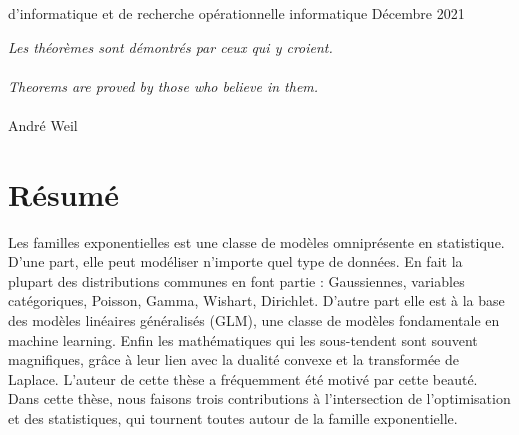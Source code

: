 \documentclass[12pt]{report} %
\numberwithin{equation}{chapter}
\numberwithin{table}{chapter}
\numberwithin{figure}{chapter}
\begin{document}




    {}
    {d'informatique et de recherche op\'{e}rationnelle}
    {informatique}
    {Décembre}
    {2021}

\PagesCouverture
\newpage
 \begin{flushright} 
 \emph{Les théorèmes sont démontrés par ceux qui y croient.}\\~\\
 \emph{Theorems are proved by those who believe in them.}  \\~\\
André Weil 
 \end{flushright}
 
 

\chapter*{Résumé}
Les familles exponentielles est une classe de modèles omniprésente en statistique.
D'une part, elle  peut modéliser n'importe quel type de données. 
En fait la plupart des distributions communes en font partie : Gaussiennes, variables catégoriques, Poisson, Gamma, Wishart, Dirichlet. 
D'autre part elle est à la base des modèles linéaires généralisés (GLM), une classe de modèles fondamentale en machine learning. 
Enfin les mathématiques qui les sous-tendent sont souvent magnifiques, grâce à leur lien avec la dualité convexe et la transformée de Laplace.
L'auteur de cette thèse a fréquemment été motivé par cette beauté.
Dans cette thèse, nous faisons trois contributions à l'intersection de l'optimisation et des statistiques, qui tournent toutes autour de la famille exponentielle. 
\end{document}
